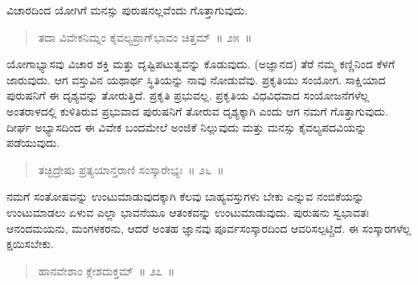 \vspace{-0.3cm}


\vskip 0.2cm

ವಿಚಾರದಿಂದ ಯೋಗಿಗೆ ಮನಸ್ಸು ಪುರುಷನಲ್ಲವೆಂದು ಗೊತ್ತಾಗುವುದು. 

\vspace{-0.3cm}

\begin{verse}
ತದಾ ವಿವೇಕನಿಮ್ನಂ ಕೈವಲ್ಯಪ್ರಾಗ್​ಭಾವಂ ಚಿತ್ತಮ್​~॥ ೨೫~॥
\end{verse}

\vspace{-0.3cm}


\vskip 0.2cm

ಯೋಗಾಭ್ಯಾಸವು ವಿಚಾರ ಶಕ್ತಿ ಮತ್ತು ದೃಷ್ಟಿಪಟುತ್ವವನ್ನು ಕೊಡುವುದು. (ಅಜ್ಞಾನದ) ತೆರೆ ನಮ್ಮ ಕಣ್ಣಿನಿಂದ ಕೆಳಗೆ ಜಾರುವುದು. ಆಗ ವಸ್ತುವಿನ ಯಥಾರ್ಥ ಸ್ಥಿತಿಯನ್ನು ನಾವು ನೋಡುವೆವು. ಪ್ರಕೃತಿಯು ಸಂಯೋಗ. ಸಾಕ್ಷಿಯಾದ ಪುರುಷನಿಗೆ ಈ ದೃಶ್ಯವನ್ನು ತೋರುತ್ತಿದೆ. ಪ್ರಕೃತಿ ಪ್ರಭುವಲ್ಲ. ಪ್ರಕೃತಿಯ ವಿಧವಿಧವಾದ ಸಂಯೋಜನೆಗಳೆಲ್ಲ ಅಂತರಾಳದಲ್ಲಿ ಕುಳಿತಿರುವ ಪ್ರಭುವಾದ ಪುರುಷನಿಗೆ ತೋರುವ ದೃಶ್ಯಕ್ಕಾಗಿ ಎಂದು ಆಗ ನಮಗೆ ಗೊತ್ತಾಗುವುದು. ದೀರ್ಘ ಅಭ್ಯಾಸದಿಂದ ಈ ವಿವೇಕ ಬಂದಮೇಲೆ ಅಂಜಿಕೆ ನಿಲ್ಲುವುದು ಮತ್ತು ಮನಸ್ಸು ಕೈವಲ್ಯಪದವಿಯನ್ನು ಪಡೆಯುವುದು. 

\vspace{-0.3cm}

\begin{verse}
ತಚ್ಛಿದ್ರೇಷು ಪ್ರತ್ಯಯಾನ್ತರಾಣಿ ಸಂಸ್ಕಾರೇಭ್ಯಃ~॥ ೨೬~॥
\end{verse}

\vspace{-0.3cm}


\vskip 0.2cm

ನಮಗೆ ಸಂತೋಷವನ್ನು ಉಂಟುಮಾಡುವುದಕ್ಕಾಗಿ ಕೆಲವು ಬಾಹ್ಯವಸ್ತುಗಳು ಬೇಕು ಎನ್ನುವ ನಂಬಿಕೆಯನ್ನು ಉಂಟುಮಾಡಲು ಏಳುವ ಎಲ್ಲಾ ಭಾವನೆಯೂ ಆತಂಕವನ್ನು ಉಂಟುಮಾಡುವುದು. ಪುರುಷನು ಸ್ವಭಾವತಃ ಆನಂದಮಯನು, ಮಂಗಳಕರನು, ಆದರೆ ಅಂತಹ ಜ್ಞಾನವು ಪೂರ್ವಸಂಸ್ಕಾರದಿಂದ ಆವರಿಸಲ್ಪಟ್ಚಿದೆ. ಈ ಸಂಸ್ಕಾರಗಳೆಲ್ಲ ಕ್ಷಯಿಸಬೇಕು. 

\vspace{-0.3cm}

\begin{verse}
ಹಾನವೇಶಾಂ ಕ್ಲೇಶದುಕ್ತಮ್​~॥ ೨೭~॥
\end{verse}

\vspace{-0.3cm}

